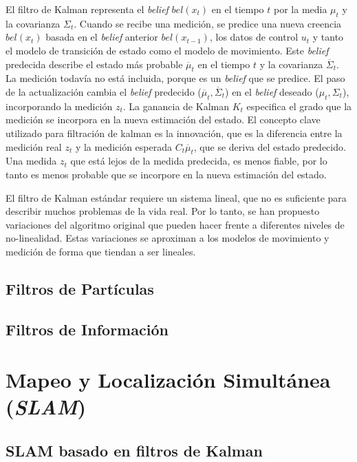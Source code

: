 El filtro de Kalman representa el \textit{belief} $bel(x_{t})$ en el tiempo 
$t$ por la media $\mu_{t}$ y la covarianza $\Sigma_{t}$. Cuando se recibe una 
medición, se predice una nueva creencia $bel(x_{t})$ basada en el \textit{belief} 
anterior $bel(x_{t-1})$, los datos de control $u_{t}$ y tanto el modelo de transición 
de estado como el modelo de movimiento. Este \textit{belief} predecida describe 
el estado más probable $\overline{\mu}_{t}$ en el tiempo $t$ y la covarianza 
$\overline{\Sigma}_{t}$. La medición todavía no está incluida, porque es 
un \textit{belief} que se predice. El paso de la actualización cambia el 
\textit{belief} predecido ($\overline{\mu}_{t},\overline{\Sigma}_{t}$) en 
el \textit{belief} deseado ($\mu_{t},\Sigma_{t}$), incorporando la medición 
$z_{t}$. La ganancia de Kalman $K_{t}$ especifica el grado que la medición se 
incorpora en la nueva estimación del estado. El concepto clave utilizado para filtración 
de kalman es la innovación, que es la diferencia entre la medición real $z_{t}$ y la 
medición esperada $C_{t}\overline{\mu}_{t}$, que se deriva del estado predecido. Una 
medida $z_{t}$ que está lejos de la medida predecida, es menos fiable, por lo tanto 
es menos probable que se incorpore en la nueva estimación del estado.

El filtro de Kalman estándar requiere un sistema lineal, que no es suficiente para 
describir muchos problemas de la vida real. Por lo tanto, se han propuesto 
variaciones del algoritmo original que pueden hacer frente a diferentes niveles de 
no-linealidad. Estas variaciones se aproximan a los modelos de movimiento y medición 
de forma que tiendan a ser lineales.


\subsection{Filtros de Part\'iculas}

\subsection{Filtros de Informaci\'on}

\section{Mapeo y Localizaci\'on Simult\'anea (\textit{SLAM})}

\subsection{SLAM basado en filtros de Kalman}

